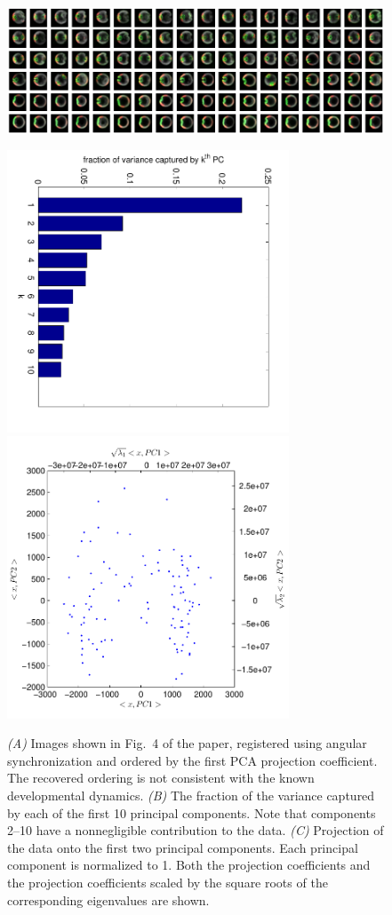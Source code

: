 \documentclass{pnastwo}
\newcommand{\fig}[0]{Fig.}
\begin{document}
\begin{figure}
\includegraphics[width=16.8cm]{data2_PCA_ordered}

\includegraphics[width=8.4cm, angle=90]{data2_PCA_variance}
\includegraphics[width=8.4cm]{data2_PCA_proj}

\caption{{\it (A)} Images shown in \fig~4 of the paper, registered using angular synchronization \cite{singer2011angular} and ordered by the first PCA projection coefficient. The recovered ordering is not consistent with the known developmental dynamics. {\it (B)} The fraction of the variance captured by each of the first 10 principal components. Note that components 2--10 have a nonnegligible contribution to the data. {\it (C)} Projection of the data onto the first two principal components. Each principal component is normalized to 1. Both the projection coefficients and the projection coefficients scaled by the square roots of the corresponding eigenvalues are shown.  }
\label{fig:PCA_results}
\end{figure}
\end{document}
